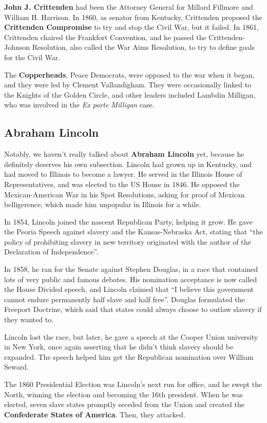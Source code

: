 \textbf{John J. Crittenden} had been the Attorney General for Millard Fillmore and William H. Harrison.
In 1860, as senator from Kentucky, Crittenden proposed the \textbf{Crittenden Compromise}
to try and stop the Civil War, but it failed.
In 1861, Crittenden chaired the Frankfort Convention,
and he passed the Crittenden-Johnson Resolution, also called the War Aims Resolution,
to try to define goals for the Civil War.

The \textbf{Copperheads}, Peace Democrats, were opposed to the war when it began,
and they were led by Clement Vallandigham.
They were occasionally linked to the Knights of the Golden Circle,
and other leaders included Lambdin Milligan, who was involved in the \textit{Ex parte Milligan} case.

\subsection*{Abraham Lincoln}

Notably, we haven't really talked about \textbf{Abraham Lincoln} yet,
because he definitely deserves his own subsection.
Lincoln had grown up in Kentucky, and had moved to Illinois to become a lawyer.
He served in the Illinois House of Representatives, and was elected to the US House in 1846.
He opposed the Mexican-American War in his Spot Resolutions, asking for proof of Mexican belligerence,
which made him unpopular in Illinois for a while.

In 1854, Lincoln joined the nascent Republican Party, helping it grow.
He gave the Peoria Speech against slavery and the Kansas-Nebraska Act, stating that
``the policy of prohibiting slavery in new territory originated with the author of the Declaration of Independence''.

In 1858, he ran for the Senate against Stephen Douglas,
in a race that contained lots of very public and famous debates.
His nomination acceptance is now called the House Divided speech, and Lincoln claimed that
``I believe this government cannot endure permanently half slave and half free''.
Douglas formulated the Freeport Doctrine,
which said that states could always choose to outlaw slavery if they wanted to.

Lincoln lost the race, but later, he gave a speech at the Cooper Union university in New York,
once again asserting that he didn't think slavery should be expanded.
The speech helped him get the Republican nomination over William Seward.

The 1860 Presidential Election was Lincoln's next run for office, and he swept the North,
winning the election and becoming the 16th president.
When he was elected, seven slave states promptly seceded from the Union
and created the \textbf{Confederate States of America}.
Then, they attacked.

